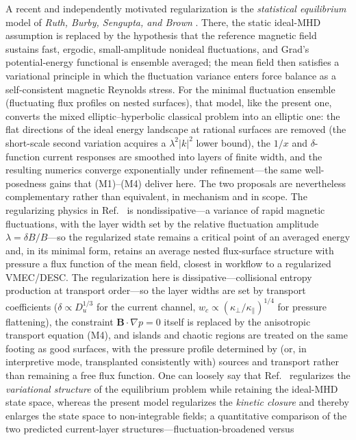 \documentclass[english]{article}
\newcommand{\bB}{\mathbf{B}}
\begin{document}
A recent and independently motivated regularization is the \emph{statistical equilibrium} model of
\emph{Ruth, Burby, Sengupta, and Brown} \cite{ruth2026}. There, the static ideal-MHD assumption is
replaced by the hypothesis that the reference magnetic field sustains fast, ergodic, small-amplitude
nonideal fluctuations, and Grad's potential-energy functional is ensemble averaged; the mean field
then satisfies a variational principle in which the fluctuation variance enters force balance as a
self-consistent magnetic Reynolds stress. For the minimal fluctuation ensemble (fluctuating flux
profiles on nested surfaces), that model, like the present one, converts the mixed
elliptic--hyperbolic classical problem into an elliptic one: the flat directions of the ideal energy
landscape at rational surfaces are removed (the short-scale second variation acquires a
$\lambda^2|k|^2$ lower bound), the $1/x$ and $\delta$-function current responses are smoothed into
layers of finite width, and the resulting numerics converge exponentially under refinement---the
same well-posedness gains that (M1)--(M4) deliver here. The two proposals are nevertheless
complementary rather than equivalent, in mechanism and in scope. The regularizing physics in
Ref.~\cite{ruth2026} is nondissipative---a variance of rapid magnetic fluctuations, with the layer
width set by the relative fluctuation amplitude $\lambda=\delta B/B$---so the regularized state
remains a critical point of an averaged energy and, in its minimal form, retains an average nested
flux-surface structure with pressure a flux function of the mean field, closest in workflow to a
regularized VMEC/DESC. The regularization here is dissipative---collisional entropy production at
transport order---so the layer widths are set by transport coefficients ($\delta\propto D_u^{1/3}$
for the current channel, $w_c\propto(\kappa_\perp/\kappa_\parallel)^{1/4}$ for pressure
flattening), the constraint $\bB\cdot\nabla p=0$ itself is replaced by the anisotropic transport
equation (M4), and islands and chaotic regions are treated on the same footing as good surfaces,
with the pressure profile determined by (or, in interpretive mode, transplanted consistently with)
sources and transport rather than remaining a free flux function. One can loosely say that
Ref.~\cite{ruth2026} regularizes the \emph{variational structure} of the equilibrium problem while
retaining the ideal-MHD state space, whereas the present model regularizes the \emph{kinetic
closure} and thereby enlarges the state space to non-integrable fields; a quantitative comparison
of the two predicted current-layer structures---fluctuation-broadened versus
\end{document}
